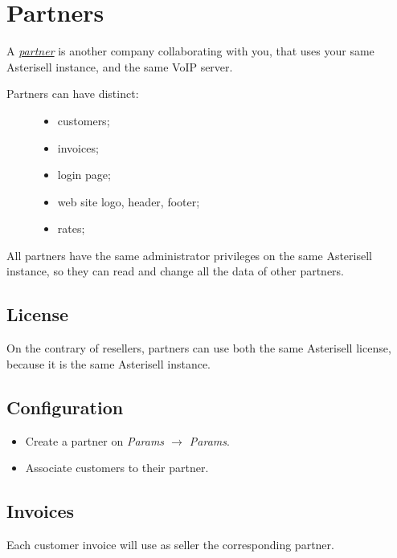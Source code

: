 \documentclass[letterpaper,10pt,english]{sphinxmanual}
\begin{document}
\section{Partners}
\label{index:partners}\label{index:id4}
A {\hyperref[index:term-partner]{\emph{partner}}} is another company collaborating with you, that uses your same Asterisell instance, and the same VoIP server.
\begin{description}
\item[{Partners can have distinct:}] \leavevmode\begin{itemize}
\item {} 
customers;

\item {} 
invoices;

\item {} 
login page;

\item {} 
web site logo, header, footer;

\item {} 
rates;

\end{itemize}

\end{description}

All partners have the same administrator privileges on the same Asterisell instance, so they can read and change all the data of other partners.


\subsection{License}
\label{index:id5}
On the contrary of resellers, partners can use both the same Asterisell license, because it is the same Asterisell instance.


\subsection{Configuration}
\label{index:configuration}\begin{itemize}
\item {} 
Create a partner on \emph{Params \(\rightarrow\) Params}.

\item {} 
Associate customers to their partner.

\end{itemize}


\subsection{Invoices}
\label{index:id6}
Each customer invoice will use as seller the corresponding partner.
\end{document}
